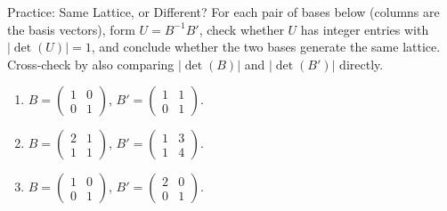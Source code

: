 \begin{exercisebox}{Practice: Same Lattice, or Different?}
For each pair of bases below (columns are the basis vectors), form $U = B^{-1}B'$, check whether $U$ has integer entries with $|\det(U)|=1$, and conclude whether the two bases generate the same lattice. Cross-check by also comparing $|\det(B)|$ and $|\det(B')|$ directly.
\begin{enumerate}[leftmargin=*, label=(\alph*)]
  \item $B = \begin{pmatrix}1 & 0 \\ 0 & 1\end{pmatrix}$, $B' = \begin{pmatrix}1 & 1 \\ 0 & 1\end{pmatrix}$.
  \item $B = \begin{pmatrix}2 & 1 \\ 1 & 1\end{pmatrix}$, $B' = \begin{pmatrix}1 & 3 \\ 1 & 4\end{pmatrix}$.
  \item $B = \begin{pmatrix}1 & 0 \\ 0 & 1\end{pmatrix}$, $B' = \begin{pmatrix}2 & 0 \\ 0 & 1\end{pmatrix}$.
\end{enumerate}
\end{exercisebox}

